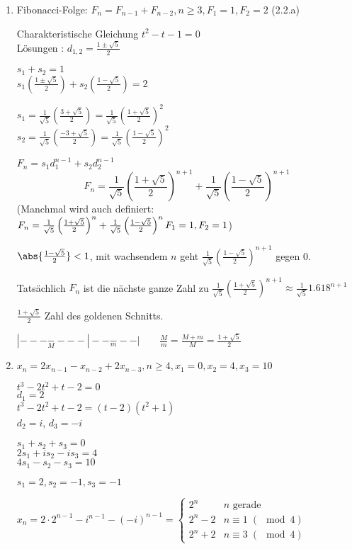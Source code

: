 \begin{enumerate}
	\item Fibonacci-Folge: 
	$F_n = F_{n-1} + F_{n-2}, n \geq 3, F_1 = 1, F_2 = 2$ (2.2.a) %
	
	Charakteristische Gleichung 
	$t^2 - t - 1 = 0$
	\\ Lösungen : $d_{1,2} = \frac{1 \pm \sqrt{5}}{2}$
	
	$s_1 + s_2 = 1$
\\	$s_1\left(\frac{1 \pm \sqrt{5}}{2}\right) 
	+ s_2\left(\frac{1 - \sqrt{5}}{2}\right) = 2$
	
	$s_1 = \frac{1}{\sqrt{5}}\left(\frac{3 + \sqrt{5}}{2}\right)
	= \frac{1}{\sqrt{5}} \left( \frac{1 + \sqrt{5}}{2} \right)^2$
	\\ 
	$s_2= \frac{1}{\sqrt{5}} \left( \frac{-3 + \sqrt{5}}{2} \right) 
	= \frac{1}{\sqrt{5}} \left( \frac{1 - \sqrt{5}}{2} \right)^2$
	
	$F_n = s_1d_1^{n-1} + s_2d_2^{n-1}$
	\[ F_n = \frac{1}{\sqrt{5}}\left( \frac{1 + \sqrt{5}}{2} \right)^{n+1} + \frac{1}{\sqrt{5}}\left( \frac{1 - \sqrt{5}}{2} \right)^{n+1} \]
	(Manchmal wird auch definiert:
	$ F_n = \frac{1}{\sqrt{5}}\left( \frac{1 + \sqrt{5}}{2} \right)^n 
	+ \frac{1}{\sqrt{5}}\left(\frac{1 - \sqrt{5}}{2}\right)^n
	\\ F_1 = 1, F_2 = 1 $)
	 
	$\abs{\frac{1 - \sqrt{5}}{2}} < 1$, mit wachsendem $n$ geht $\frac{1}{\sqrt{5}}\left( \frac{1 - \sqrt{5}}{2} \right)^{n+1}$ gegen 0.
	
	Tatsächlich $F_n$ ist die nächste ganze Zahl zu $\frac{1}{\sqrt{5}}\left( \frac{1 + \sqrt{5}}{2} \right)^{n+1} \approx \frac{1}{\sqrt{5}}1.618^{n+1} $
	
	$\frac{1 + \sqrt{5}}{2}$ Zahl des goldenen Schnitts.
	
	$|---\underset{M}{-}---|--\underset{m}{-}--| \qquad \frac{M}{m} = \frac{M + m}{M} = \frac{1 + \sqrt{5}}{2}$
	
	
	\item 
	$x_n = 2x_{n-1} - x_{n-2} + 2x_{n-3}, n \geq 4, x_1 = 0, x_2 = 4, x_3 = 10 $

	$t^3 - 2t^2  + t - 2 = 0$
	\\ $d_1 = 2$
	\\ $t^3 - 2t^2 + t - 2 = (t-2)(t^2+1)$
	\\ $d_2 = i$, $d_3 = -i$
	

	$s_1 + s_2 + s_3 = 0$
	\\$2s_1 + is_2 - is_3 = 4$
	\\$4s_1 -s_2 -s_3 = 10$	
	
	$s_1 =2, s_2 = -1, s_3 = -1$
	
	$ x_n = 2 \cdot 2^{n-1} - i^{n-1} - (-i)^{n-1}
	      = \begin{cases}
	      2^n & n \text{ gerade} \\
	      2^n - 2 & n \equiv 1  \;(\!\!\!\!\mod 4) \\
	      2^n + 2 & n \equiv 3 \;(\!\!\!\!\mod 4)
	      \end{cases} $
	
	 

\end{enumerate}



